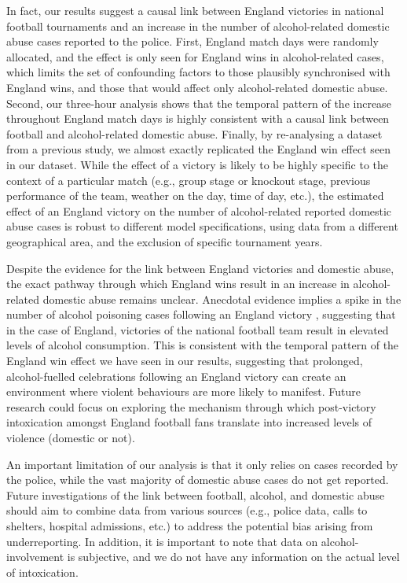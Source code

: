 \documentclass[12pt, a4paper]{article}
\begin{document}
In fact, our results suggest a causal link between England victories in national football tournaments and an increase in the number of alcohol-related domestic abuse cases reported to the police. First, England match days were randomly allocated, and the effect is only seen for England wins in alcohol-related cases, which limits the set of confounding factors to those plausibly synchronised with England wins, and those that would affect only alcohol-related domestic abuse. Second, our three-hour analysis shows that the temporal pattern of the increase throughout England match days is highly consistent with a causal link between football and alcohol-related domestic abuse. Finally, by re-analysing a dataset from a previous study, we almost exactly replicated the England win effect seen in our dataset. While the effect of a victory is likely to be highly specific to the context of a particular match (e.g., group stage or knockout stage, previous performance of the team, weather on the day, time of day, etc.), the estimated effect of an England victory on the number of alcohol-related reported domestic abuse cases is robust to different model specifications, using data from a different geographical area, and the exclusion of specific tournament years.

Despite the evidence for the link between England victories and domestic abuse, the exact pathway through which England wins result in an increase in alcohol-related domestic abuse remains unclear. Anecdotal evidence implies a spike in the number of alcohol poisoning cases following an England victory  \cite{Davies2018}, suggesting that in the case of England, victories of the national football team result in elevated levels of alcohol consumption. This is consistent with the temporal pattern of the England win effect we have seen in our results, suggesting that prolonged, alcohol-fuelled celebrations following an England victory can create an environment where violent behaviours are more likely to manifest. Future research could focus on exploring the mechanism through which post-victory intoxication amongst England football fans translate into increased levels of violence (domestic or not).


An important limitation of our analysis is that it only relies on cases recorded by the police, while the vast majority of domestic abuse cases do not get reported. Future investigations of the link between football, alcohol, and domestic abuse should aim to combine data from various sources (e.g., police data, calls to shelters, hospital admissions, etc.) to address the potential bias arising from underreporting. In addition, it is important to note that data on alcohol-involvement is subjective, and we do not have any information on the actual level of intoxication.
\end{document}

